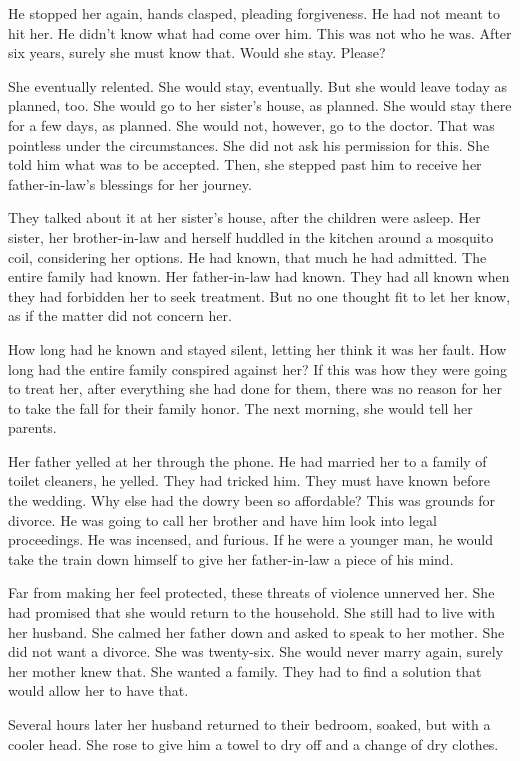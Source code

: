 \documentclass{article}
\begin{document}
He stopped her again, hands clasped, pleading forgiveness. He had not meant to hit her. He didn't know what had come over him. This was not who he was. After six years, surely she must know that. Would she stay. Please?

She eventually relented. She would stay, eventually. But she would leave today as planned, too. She would go to her sister's house, as planned. She would stay there for a few days, as planned. She would not, however, go to the doctor. That was pointless under the circumstances. She did not ask his permission for this. She told him what was to be accepted. Then, she stepped past him to receive her father-in-law's blessings for her journey.

They talked about it at her sister's house, after the children were asleep. Her sister, her brother-in-law and herself huddled in the kitchen around a mosquito coil, considering her options. He had known, that much he had admitted. The entire family had known. Her father-in-law had known. They had all known when they had forbidden her to seek treatment. But no one thought fit to let her know, as if the matter did not concern her.

How long had he known and stayed silent, letting her think it was her fault. How long had the entire family conspired against her? If this was how they were going to treat her, after everything she had done for them, there was no reason for her to take the fall for their family honor. The next morning, she would tell her parents. 

Her father yelled at her through the phone. He had married her to a family of toilet cleaners, he yelled. They had tricked him. They must have known before the wedding. Why else had the dowry been so affordable? This was grounds for divorce. He was going to call her brother and have him look into legal proceedings. He was incensed, and furious. If he were a younger man, he would take the train down himself to give her father-in-law a piece of his mind.

Far from making her feel protected, these threats of violence unnerved her. She had promised that she would return to the household. She still had to live with her husband. She calmed her father down and asked to speak to her mother. She did not want a divorce. She was twenty-six. She would never marry again, surely her mother knew that. She wanted a family. They had to find a solution that would allow her to have that.

Several hours later her husband returned to their bedroom, soaked, but with a cooler head. She rose to give him a towel to dry off and a change of dry clothes. 
\end{document}
